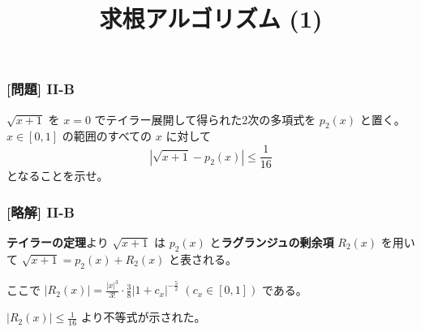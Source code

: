 \documentclass[dvipdfmx,aspectratio=169,20pt]{beamer}
\begin{document}
\begin{frame}
\frametitle{[問題] I\hspace{-.01em}I-B}
$\sqrt{x+1}$ を $x=0$ でテイラー展開して得られた2次の多項式を $p_2(x)$ と置く。
$x\in [0,1]$ の範囲のすべての $x$ に対して
\begin{equation*}
    |\sqrt{x+1} - p_2(x)|\le \frac{1}{16}
\end{equation*}
となることを示せ。
\end{frame}
\begin{frame}
\frametitle{[略解] I\hspace{-.01em}I-B}
{\bf テイラーの定理}より $\sqrt{x+1}$ は $p_2(x)$ と{\bf ラグランジュの剰余項} $R_2(x)$ を用いて $\sqrt{x+1} = p_2(x)+R_2(x)$ と表される。
\vspace{0.5cm}

ここで $|R_2(x)|=\frac{|x|^{3}}{3!}\cdot \frac{3}{8}|1+c_x|^{-\frac{5}{2}}$ $(c_x\in [0,1])$ である。
\vspace{0.5cm}

$|R_2(x)|\le \frac{1}{16}$ より不等式が示された。

\end{frame}

\title{求根アルゴリズム (1)}

\end{document}
